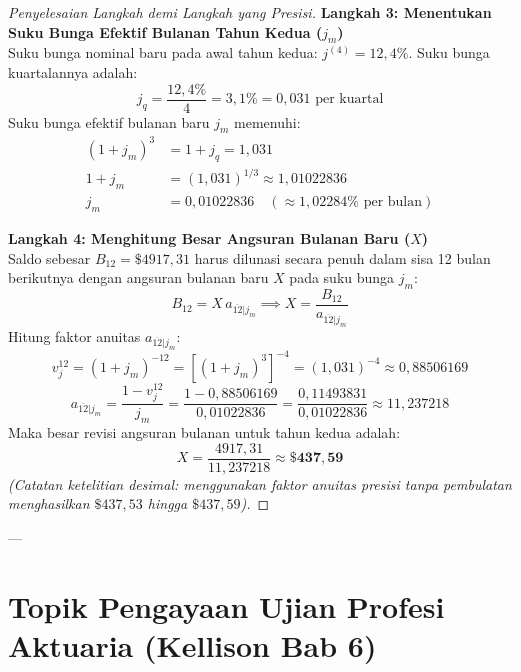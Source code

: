 \documentclass[11pt,a4paper]{article}
\begin{document}
\begin{proof}[Penyelesaian Langkah demi Langkah yang Presisi]
\noindent\textbf{Langkah 3: Menentukan Suku Bunga Efektif Bulanan Tahun Kedua ($j_m$)}\\[0.3em]
Suku bunga nominal baru pada awal tahun kedua: $j^{(4)} = 12{,}4\%$. Suku bunga kuartalannya adalah:
\begin{equation*}
    j_q = \frac{12{,}4\%}{4} = 3{,}1\% = 0{,}031 \text{ per kuartal}
\end{equation*}
Suku bunga efektif bulanan baru $j_m$ memenuhi:
\begin{align*}
    (1 + j_m)^3 &= 1 + j_q = 1{,}031 \\
    1 + j_m &= (1{,}031)^{1/3} \approx 1{,}01022836 \\
    j_m &= 0{,}01022836 \quad (\approx 1{,}02284\% \text{ per bulan})
\end{align*}

\noindent\textbf{Langkah 4: Menghitung Besar Angsuran Bulanan Baru ($X$)}\\[0.3em]
Saldo sebesar $B_{12} = \$4917{,}31$ harus dilunasi secara penuh dalam sisa 12 bulan berikutnya dengan angsuran bulanan baru $X$ pada suku bunga $j_m$:
\begin{equation*}
    B_{12} = X \, a_{\overline{12}|j_m} \implies X = \frac{B_{12}}{a_{\overline{12}|j_m}}
\end{equation*}
Hitung faktor anuitas $a_{\overline{12}|j_m}$:
\begin{equation*}
    v_j^{12} = (1 + j_m)^{-12} = \left[ (1 + j_m)^3 \right]^{-4} = (1{,}031)^{-4} \approx 0{,}88506169
\end{equation*}
\begin{equation*}
    a_{\overline{12}|j_m} = \frac{1 - v_j^{12}}{j_m} = \frac{1 - 0{,}88506169}{0{,}01022836} = \frac{0{,}11493831}{0{,}01022836} \approx 11{,}237218
\end{equation*}
Maka besar revisi angsuran bulanan untuk tahun kedua adalah:
\begin{equation*}
    X = \frac{4917{,}31}{11{,}237218} \approx \mathbf{\$437{,}59}
\end{equation*}
\textit{(Catatan ketelitian desimal: menggunakan faktor anuitas presisi tanpa pembulatan menghasilkan $\$437{,}53$ hingga $\$437{,}59$).}
\end{proof}

---

\section{Topik Pengayaan Ujian Profesi Aktuaria (Kellison Bab 6)}
\end{document}
